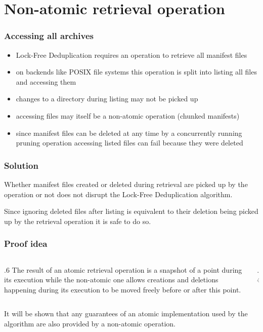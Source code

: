 \documentclass[english,utf8,aspectratio=169]{beamer}
\begin{document}
    \section{Non-atomic retrieval operation}
    \begin{frame}
        \frametitle{Accessing all archives}
        \begin{itemize}
            \item Lock-Free Deduplication requires an operation to retrieve all manifest
                files~\cite[Operation `downloadAllManifestFiles']{Duplicacy}
            \item on backends like POSIX file systems this operation is split into listing
                all files and accessing them
            \item changes to a directory during listing may not be picked up
            \item accessing files may itself be a non-atomic operation (chunked manifests)
            \item since manifest files can be deleted at any time by a concurrently running
                pruning operation accessing listed files can fail because they were deleted
        \end{itemize}
    \end{frame}

    \begin{frame}
        \frametitle{Solution}
        \begin{theorem}
            Whether manifest files created or deleted during retrieval are picked up by the operation
            or not does not disrupt the Lock-Free Deduplication algorithm.
        \end{theorem}
        \begin{corollary}
            Since ignoring deleted files after listing is equivalent to their deletion being picked
            up by the retrieval operation it is safe to do so.
        \end{corollary}
    \end{frame}

    \begin{frame}
        \frametitle{Proof idea}
        \begin{columns}
            \begin{column}{.6\textwidth}
                The result of an atomic retrieval operation is a snapshot of a point during its
                execution while the non-atomic one allows creations and deletions happening during
                its execution to be moved freely before or after this point.
            \end{column}
            \begin{column}{.4\textwidth}
                
            \end{column}
        \end{columns}
        \vfill
        It will be shown that any guarantees of an atomic implementation used by the algorithm
        are also provided by a non-atomic operation.
    \end{frame}
\end{document}
